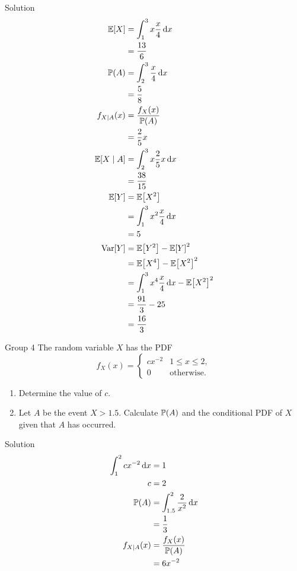 \documentclass{article}
\begin{document}
\begin{solution}
    {Solution}
    \begin{align*}
        \E{X} &= \int_{1}^{3}x\frac{x}{4}\diff x \\
        &= \frac{13}{6} \\
        \P{A} &= \int_{2}^{3}\frac{x}{4}\diff x \\
        &= \frac{5}{8} \\
        f_{X\mid A}(x) &= \frac{f_X(x)}{\P{A}} \\
        &= \frac{2}{5}x \\
        \E{X\mid A} &= \int_{2}^{3}x\frac{2}{5}x\diff x \\
        &= \frac{38}{15} \\
        \E{Y} &= \E{X^2} \\
        &= \int_{1}^{3}x^2\frac{x}{4}\diff x \\
        &= 5 \\
        \Var[Y] &= \E{Y^2}-\E{Y}^2 \\
        &= \E{X^4}-\E{X^2}^2 \\
        &= \int_{1}^{3}x^4\frac{x}{4}\diff x - \E{X^2}^2 \\
        &= \frac{91}{3}-25 \\
        &= \frac{16}{3}
    \end{align*}
\end{solution}

\begin{problem}
    {Group 4}
    The random variable $X$ has the PDF
    \[
        f_X(x)={
            \begin{cases}
                cx^{-2} & 1\leq x\leq 2,\\
                0 & \text{otherwise.}
            \end{cases}
        }
    \]
    \begin{enumerate}
        \item Determine the value of $c$.
        \item Let $A$ be the event ${X > 1.5}$. Calculate $\P{A}$ and the conditional PDF of $X$ given that $A$ has occurred.
    \end{enumerate}
\end{problem}

\begin{solution}
    {Solution}
    \begin{align*}
        \int_{1}^{2}cx^{-2}\diff x &= 1 \\
        c &= 2 \\
        \P{A} &= \int_{1.5}^{2}\frac{2}{x^2}\diff x \\
        &= \frac{1}{3} \\
        f_{X\mid A}(x) &= \frac{f_X(x)}{\P{A}} \\
        &= 6x^{-2}
    \end{align*}
\end{solution}
\end{document}
